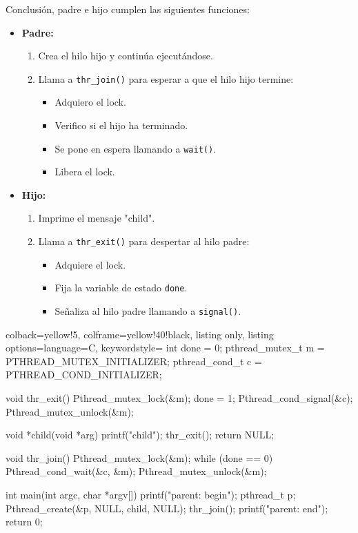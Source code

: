 \documentclass[openany]{book}
\begin{document}
Conclusión, padre e hijo cumplen las siguientes funciones:

\begin{itemize}
    \item \textbf{Padre:}
    \begin{enumerate}
        \item Crea el hilo hijo y continúa ejecutándose.
        \item Llama a \texttt{thr\_join()} para esperar a que el hilo hijo termine:
        \begin{itemize}
            \item Adquiero el lock.
            \item Verifico si el hijo ha terminado.
            \item Se pone en espera llamando a \texttt{wait()}.
            \item Libera el lock.
        \end{itemize}
    \end{enumerate}
    \item \textbf{Hijo:}
    \begin{enumerate}
        \item Imprime el mensaje "child".
        \item Llama a \texttt{thr\_exit()} para despertar al hilo padre:
        \begin{itemize}
            \item Adquiere el lock.
            \item Fija la variable de estado \texttt{done}.
            \item Señaliza al hilo padre llamando a \texttt{signal()}.
        \end{itemize}
    \end{enumerate}
\end{itemize}

\newpage
\begin{tcblisting}{colback=yellow!5, colframe=yellow!40!black, listing only, listing options={language=C, keywordstyle=\color{blue!35!white}\bfseries}}
int done = 0;
pthread_mutex_t m = PTHREAD_MUTEX_INITIALIZER;
pthread_cond_t c = PTHREAD_COND_INITIALIZER;
    
void thr_exit() {
    Pthread_mutex_lock(&m);
    done = 1;
    Pthread_cond_signal(&c);
    Pthread_mutex_unlock(&m);
}
    
void *child(void *arg) {
    printf("child\n");
    thr_exit();
    return NULL;
}

void thr_join() {
    Pthread_mutex_lock(&m);
    while (done == 0)
        Pthread_cond_wait(&c, &m);
    Pthread_mutex_unlock(&m);
}

int main(int argc, char *argv[]) {
    printf("parent: begin\n");
    pthread_t p;
    Pthread_create(&p, NULL, child, NULL);
    thr_join();
    printf("parent: end\n");
    return 0;
}
\end{tcblisting}    
\end{document}

